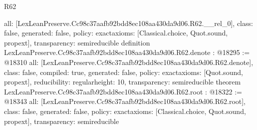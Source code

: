 \begin{lexlean}{R62}
\begin{coremodule}
{  all: [LexLeanPreserve.Cc98c37aafb92bdd8ec108aa430da9d06.R62.__rel_0],
  class: false,
  generated: false,
  policy: exact{axioms: [Classical.choice, Quot.sound, propext]},
  transparency: semireducible
}
definition LexLeanPreserve.Cc98c37aafb92bdd8ec108aa430da9d06.R62.denote : @18295 := @18310 {
  all: [LexLeanPreserve.Cc98c37aafb92bdd8ec108aa430da9d06.R62.denote],
  class: false,
  compiled: true,
  generated: false,
  policy: exact{axioms: [Quot.sound, propext]},
  reducibility: regular{height: 10},
  transparency: semireducible
}
theorem LexLeanPreserve.Cc98c37aafb92bdd8ec108aa430da9d06.R62.root : @18322 := @18343 {
  all: [LexLeanPreserve.Cc98c37aafb92bdd8ec108aa430da9d06.R62.root],
  class: false,
  generated: false,
  policy: exact{axioms: [Classical.choice, Quot.sound, propext]},
  transparency: semireducible
}


\end{coremodule}
\end{lexlean}
